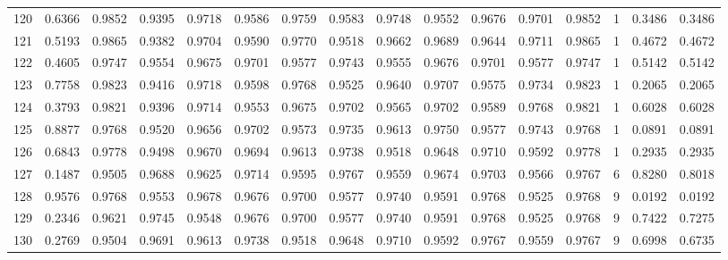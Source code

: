 \begin{tabular}{lrrrrrrrrrrrrrrr}
120 &      0.6366 &  0.9852 &  0.9395 &  0.9718 &  0.9586 &  0.9759 &  0.9583 &  0.9748 &  0.9552 &  0.9676 &   0.9701 &     0.9852 &      1 &                    0.3486 &                     0.3486 \\
121 &      0.5193 &  0.9865 &  0.9382 &  0.9704 &  0.9590 &  0.9770 &  0.9518 &  0.9662 &  0.9689 &  0.9644 &   0.9711 &     0.9865 &      1 &                    0.4672 &                     0.4672 \\
122 &      0.4605 &  0.9747 &  0.9554 &  0.9675 &  0.9701 &  0.9577 &  0.9743 &  0.9555 &  0.9676 &  0.9701 &   0.9577 &     0.9747 &      1 &                    0.5142 &                     0.5142 \\
123 &      0.7758 &  0.9823 &  0.9416 &  0.9718 &  0.9598 &  0.9768 &  0.9525 &  0.9640 &  0.9707 &  0.9575 &   0.9734 &     0.9823 &      1 &                    0.2065 &                     0.2065 \\
124 &      0.3793 &  0.9821 &  0.9396 &  0.9714 &  0.9553 &  0.9675 &  0.9702 &  0.9565 &  0.9702 &  0.9589 &   0.9768 &     0.9821 &      1 &                    0.6028 &                     0.6028 \\
125 &      0.8877 &  0.9768 &  0.9520 &  0.9656 &  0.9702 &  0.9573 &  0.9735 &  0.9613 &  0.9750 &  0.9577 &   0.9743 &     0.9768 &      1 &                    0.0891 &                     0.0891 \\
126 &      0.6843 &  0.9778 &  0.9498 &  0.9670 &  0.9694 &  0.9613 &  0.9738 &  0.9518 &  0.9648 &  0.9710 &   0.9592 &     0.9778 &      1 &                    0.2935 &                     0.2935 \\
127 &      0.1487 &  0.9505 &  0.9688 &  0.9625 &  0.9714 &  0.9595 &  0.9767 &  0.9559 &  0.9674 &  0.9703 &   0.9566 &     0.9767 &      6 &                    0.8280 &                     0.8018 \\
128 &      0.9576 &  0.9768 &  0.9553 &  0.9678 &  0.9676 &  0.9700 &  0.9577 &  0.9740 &  0.9591 &  0.9768 &   0.9525 &     0.9768 &      9 &                    0.0192 &                     0.0192 \\
129 &      0.2346 &  0.9621 &  0.9745 &  0.9548 &  0.9676 &  0.9700 &  0.9577 &  0.9740 &  0.9591 &  0.9768 &   0.9525 &     0.9768 &      9 &                    0.7422 &                     0.7275 \\
130 &      0.2769 &  0.9504 &  0.9691 &  0.9613 &  0.9738 &  0.9518 &  0.9648 &  0.9710 &  0.9592 &  0.9767 &   0.9559 &     0.9767 &      9 &                    0.6998 &                     0.6735 \\

\end{tabular}
